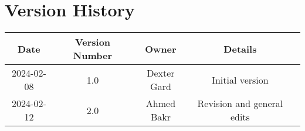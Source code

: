 \section*{Version History}

\begin{table}[ht]
    \centering
    \begin{tabular}[t]{ccccc}
    \toprule
    \color{Tue-red}\textbf{Date}&\color{Tue-red}\textbf{Version Number}&\color{Tue-red}\textbf{Owner}&\color{Tue-red}\textbf{Details}\\
    \midrule
    2024-02-08&1.0&Dexter Gard&Initial version\\
    2024-02-12&2.0&Ahmed Bakr&Revision and general edits\\
    \bottomrule
    \end{tabular}
    \label{table: style 1}
    \end{table}